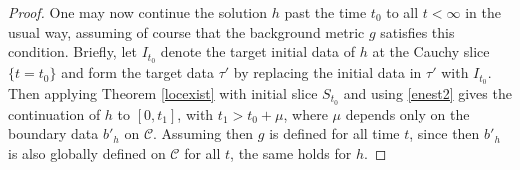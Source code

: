 \documentclass[10pt,a4paper]{amsart}
\newcommand{\cC}{{\mathcal C}}
\begin{document}
\begin{proof}
  One may now continue the solution $h$ past the time $t_0$ to all $t < \infty$ in the usual way, assuming of course that the background metric 
$g$ satisfies this condition. Briefly, let $I_{t_0}$ denote the target initial data of $h$ at the Cauchy slice $\{t=t_0\}$ and form the target data 
$\tau'$ by replacing the initial data in $\tau'$ with $I_{t_0}$. Then applying Theorem \ref{locexist} with initial slice $S_{t_0}$ and using \eqref{enest2} 
gives the continuation of $h$ to $[0, t_1]$, with $t_1 > t_0 + \mu$, where $\mu$ depends only on the boundary data $b'_h$ on $\cC$. 
Assuming then $g$ is defined for all time $t$, since then $b'_h$ is also globally defined on $\cC$ for all $t$, the same holds for $h$. 
  
\end{proof}
\end{document}
